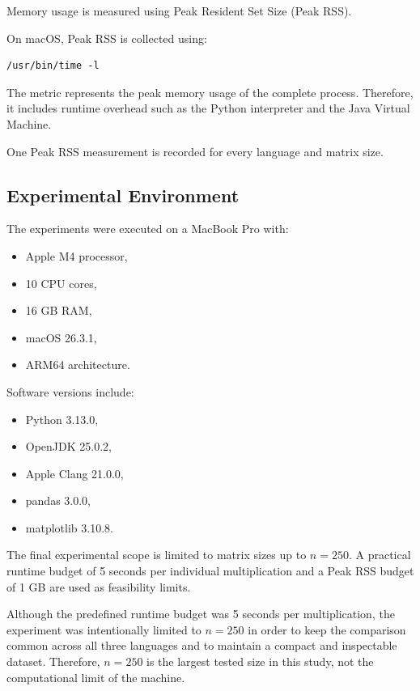 \documentclass[11pt,a4paper]{article}
\begin{document}
Memory usage is measured using Peak Resident Set Size (Peak RSS).

On macOS, Peak RSS is collected using:

\begin{verbatim}
/usr/bin/time -l
\end{verbatim}

The metric represents the peak memory usage of the complete process. Therefore, it includes runtime overhead such as the Python interpreter and the Java Virtual Machine.

One Peak RSS measurement is recorded for every language and matrix size.

\subsection{Experimental Environment}

The experiments were executed on a MacBook Pro with:

\begin{itemize}
    \item Apple M4 processor,
    \item 10 CPU cores,
    \item 16 GB RAM,
    \item macOS 26.3.1,
    \item ARM64 architecture.
\end{itemize}

Software versions include:

\begin{itemize}
    \item Python 3.13.0,
    \item OpenJDK 25.0.2,
    \item Apple Clang 21.0.0,
    \item pandas 3.0.0,
    \item matplotlib 3.10.8.
\end{itemize}

The final experimental scope is limited to matrix sizes up to $n=250$. A practical runtime budget of 5 seconds per individual multiplication and a Peak RSS budget of 1 GB are used as feasibility limits.

Although the predefined runtime budget was 5 seconds per multiplication, the experiment was intentionally limited to $n=250$ in order to keep the comparison common across all three languages and to maintain a compact and inspectable dataset. Therefore, $n=250$ is the largest tested size in this study, not the computational limit of the machine.
\end{document}
